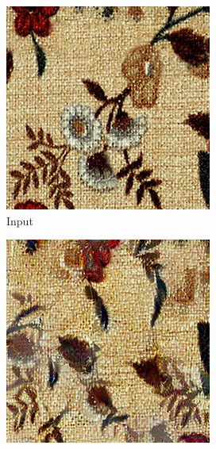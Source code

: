 \begin{figure}[ht]
    \centering    
    \begin{subfigure}{0.8\textwidth}
        \centering
        \begin{subfigure}{0.32\textwidth}
            \centering
            \includegraphics[width=\textwidth]{images/03-comparison_small_target.jpg}
            \caption{Input}
            \label{fig:methods_comparison_small-target}
        \end{subfigure}
        \hfill
        \begin{subfigure}{0.32\textwidth}
            \centering
            \includegraphics[width=\textwidth]{images/03-comparison_small_vanilla.jpg}

\end{subfigure}
\end{subfigure}
\end{figure}
